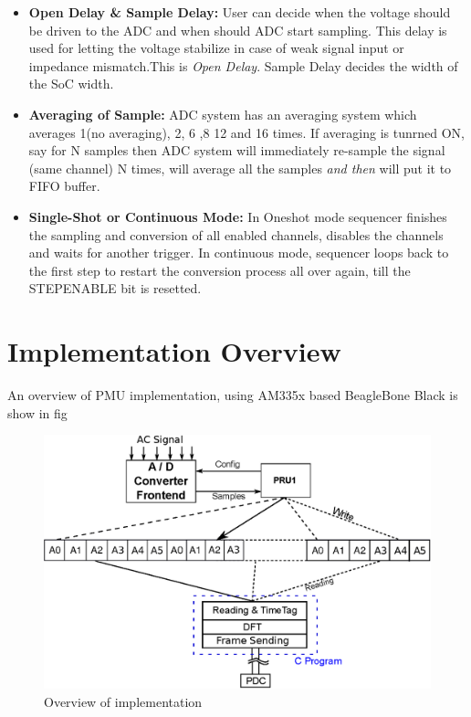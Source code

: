 \begin{itemize}
	\item \textbf{Open Delay \& Sample Delay:} User can decide when the voltage should be driven to the ADC and when should ADC start sampling. This delay is used for letting the voltage stabilize in case of weak signal input or impedance mismatch.This is \textit{Open Delay}. Sample Delay decides the width of the SoC width.
	\item \textbf{Averaging of Sample:} ADC system has an averaging system which averages 1(no averaging), 2, 6 ,8 12 and 16 times. If averaging is tunrned ON, say for N samples then ADC system will immediately re-sample the signal (same channel) N times, will average all the samples \textit{and then} will put it to FIFO buffer.
	\item \textbf{Single-Shot or Continuous Mode:} In Oneshot mode sequencer finishes the sampling and conversion of all enabled channels, disables the channels and waits for another trigger. In continuous mode, sequencer loops back to the first step to restart the conversion process all over again, till the STEPENABLE bit is resetted.    
\end{itemize} 

\section{Implementation Overview}
An overview of PMU implementation, using AM335x based BeagleBone Black is show in fig 
\begin{figure}
	\includegraphics[width=\textwidth]{fig/sys_overview.eps}
	\caption{Overview of implementation}
\end{figure}

